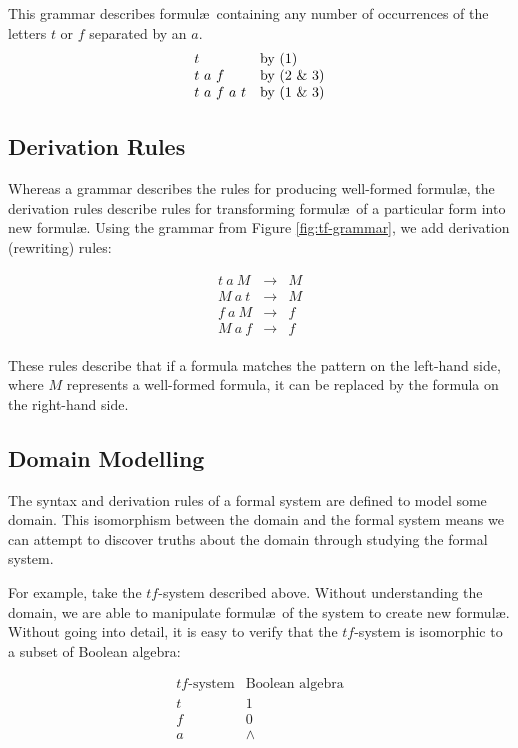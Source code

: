 This grammar describes formul\ae\ containing any number of occurrences of the letters $t$ or $f$ separated by an $a$. 
\[
\begin{array}{ll}
  t & \text{by (1)} \\
  t\ a\ f & \text{by (2 \& 3)} \\
  t\ a\ f\ a\ t & \text{by (1 \& 3)}
\end{array}
\]

\subsection{Derivation Rules}
Whereas a grammar describes the rules for producing well-formed formul\ae,
the derivation rules describe rules for transforming formul\ae\ of a particular form into new formul\ae. 
Using the grammar from Figure \ref{fig:tf-grammar}, we add derivation (rewriting) rules:

\[
\begin{array}{lcl}
  t\ a\ M &\to& M \\ 
  M\ a\ t &\to& M \\
  f\ a\ M &\to& f \\
  M\ a\ f &\to& f \\
\end{array}
\]

These rules describe that if a formula matches the pattern on the 
left-hand side, where $M$ represents a well-formed formula, it can be
replaced by the formula on the right-hand side.

\subsection{Domain Modelling}

The syntax and derivation rules of a formal system are defined to model 
some domain. This isomorphism between the domain and the formal system
means we can attempt to discover truths about the domain through studying
the formal system.

For example, take the $tf$-system described above. 
Without understanding the domain, we are able to manipulate formul\ae\ of the system to create new formul\ae. 
Without going into detail, it is easy to verify that the $tf$-system is isomorphic to a subset of Boolean algebra:

\[
\begin{array}{cc}
\text{$tf$-system} & \text{Boolean algebra} \\
t & 1 \\
f & 0 \\
a & \wedge \\
\end{array}
\]

